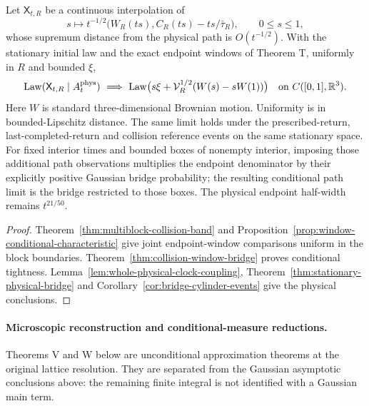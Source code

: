 \begin{maintheorem}
\label{thm:intro-stationary-window-bridge}
Let $\mathsf X_{t,R}$ be a continuous interpolation of
\[
 s\longmapsto t^{-1/2}
   \bigl(W_R(ts),C_R(ts)-ts/\bar\tau_R\bigr),\qquad 0\le s\le1,
\]
whose supremum distance from the physical path is $O(t^{-1/2})$.
With the stationary initial law and the exact endpoint windows of
Theorem T, uniformly in $R$ and bounded $\xi$,
\[
 \operatorname{Law}(\mathsf X_{t,R}\mid A_t^{\rm phys})
       \ \Longrightarrow\
 \operatorname{Law}\bigl(s\xi+
     \mathcal V_R^{1/2}(W(s)-sW(1))\bigr)
       \quad\hbox{on }C([0,1],\mathbb R^3).
\]
Here $W$ is standard three-dimensional Brownian motion. Uniformity
is in bounded-Lipschitz distance. The same limit holds under the
prescribed-return, last-completed-return and collision reference events
on the same stationary space. For fixed interior times and bounded
boxes of nonempty interior, imposing those additional path observations
multiplies the endpoint denominator by their explicitly positive
Gaussian bridge probability; the resulting conditional path limit is
the bridge restricted to those boxes. The physical endpoint half-width
remains $t^{21/50}$.
\end{maintheorem}
\begin{proof}
Theorem~\ref{thm:multiblock-collision-band} and
Proposition~\ref{prop:window-conditional-characteristic} give joint
endpoint-window comparisons uniform in the block boundaries.
Theorem~\ref{thm:collision-window-bridge} proves conditional tightness.
Lemma~\ref{lem:whole-physical-clock-coupling},
Theorem~\ref{thm:stationary-physical-bridge} and
Corollary~\ref{cor:bridge-cylinder-events} give the physical conclusions.
\end{proof}

\paragraph{Microscopic reconstruction and conditional-measure reductions.}
Theorems V and W below are unconditional approximation theorems at the
original lattice resolution. They are separated from the Gaussian
asymptotic conclusions above: the remaining finite integral is not
identified with a Gaussian main term.

